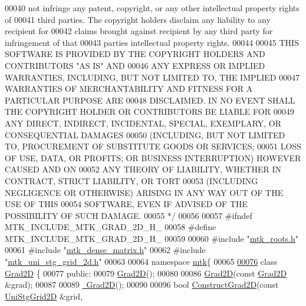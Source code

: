 \begin{DoxyCode}
00040 \textcolor{comment}{not infringe any patent, copyright, or any other intellectual property rights of}
00041 \textcolor{comment}{third parties. The copyright holders disclaim any liability to any recipient for}
00042 \textcolor{comment}{claims brought against recipient by any third party for infringement of that}
00043 \textcolor{comment}{parties intellectual property rights.}
00044 \textcolor{comment}{}
00045 \textcolor{comment}{THIS SOFTWARE IS PROVIDED BY THE COPYRIGHT HOLDERS AND CONTRIBUTORS "AS IS" AND}
00046 \textcolor{comment}{ANY EXPRESS OR IMPLIED WARRANTIES, INCLUDING, BUT NOT LIMITED TO, THE IMPLIED}
00047 \textcolor{comment}{WARRANTIES OF MERCHANTABILITY AND FITNESS FOR A PARTICULAR PURPOSE ARE}
00048 \textcolor{comment}{DISCLAIMED. IN NO EVENT SHALL THE COPYRIGHT HOLDER OR CONTRIBUTORS BE LIABLE FOR}
00049 \textcolor{comment}{ANY DIRECT, INDIRECT, INCIDENTAL, SPECIAL, EXEMPLARY, OR CONSEQUENTIAL DAMAGES}
00050 \textcolor{comment}{(INCLUDING, BUT NOT LIMITED TO, PROCUREMENT OF SUBSTITUTE GOODS OR SERVICES;}
00051 \textcolor{comment}{LOSS OF USE, DATA, OR PROFITS; OR BUSINESS INTERRUPTION) HOWEVER CAUSED AND ON}
00052 \textcolor{comment}{ANY THEORY OF LIABILITY, WHETHER IN CONTRACT, STRICT LIABILITY, OR TORT}
00053 \textcolor{comment}{(INCLUDING NEGLIGENCE OR OTHERWISE) ARISING IN ANY WAY OUT OF THE USE OF THIS}
00054 \textcolor{comment}{SOFTWARE, EVEN IF ADVISED OF THE POSSIBILITY OF SUCH DAMAGE.}
00055 \textcolor{comment}{*/}
00056 
00057 \textcolor{preprocessor}{#ifndef MTK\_INCLUDE\_MTK\_GRAD\_2D\_H\_}
00058 \textcolor{preprocessor}{#define MTK\_INCLUDE\_MTK\_GRAD\_2D\_H\_}
00059 
00060 \textcolor{preprocessor}{#include "\hyperlink{mtk__roots_8h}{mtk\_roots.h}"}
00061 \textcolor{preprocessor}{#include "\hyperlink{mtk__dense__matrix_8h}{mtk\_dense\_matrix.h}"}
00062 \textcolor{preprocessor}{#include "\hyperlink{mtk__uni__stg__grid__2d_8h}{mtk\_uni\_stg\_grid\_2d.h}"}
00063 
00064 \textcolor{keyword}{namespace }\hyperlink{namespacemtk}{mtk}\{
00065 
\hypertarget{mtk__grad__2d_8h_source_l00076}{}\hyperlink{classmtk_1_1Grad2D}{00076} \textcolor{keyword}{class }\hyperlink{classmtk_1_1Grad2D}{Grad2D} \{
00077  \textcolor{keyword}{public}:
00079   \hyperlink{classmtk_1_1Grad2D_a15bdca254b7bf662913b34c7afb8d4c9}{Grad2D}();
00080 
00086   \hyperlink{classmtk_1_1Grad2D_a15bdca254b7bf662913b34c7afb8d4c9}{Grad2D}(\textcolor{keyword}{const} \hyperlink{classmtk_1_1Grad2D}{Grad2D} &grad);
00087 
00089   \hyperlink{classmtk_1_1Grad2D_ae6a071b24422d057c41346e80be96cb3}{~Grad2D}();
00090 
00096   \textcolor{keywordtype}{bool} \hyperlink{classmtk_1_1Grad2D_a9771be954c59880e3d83f4d645378c00}{ConstructGrad2D}(\textcolor{keyword}{const} \hyperlink{classmtk_1_1UniStgGrid2D}{UniStgGrid2D} &grid,

\end{DoxyCode}
